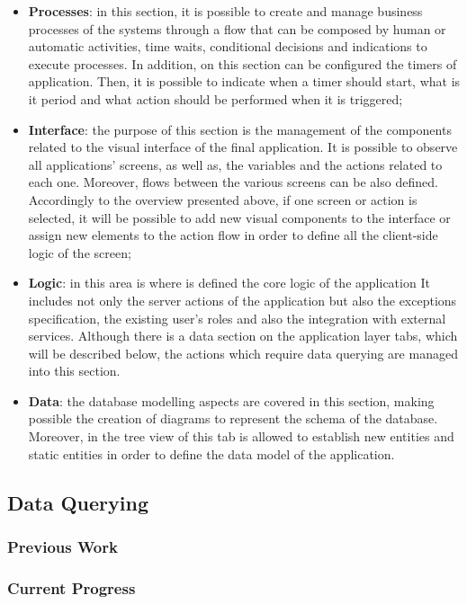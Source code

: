 \begin{itemize}
	\item \textbf{Processes}: in this section, it is possible to create and manage business processes of the systems through a flow that can be composed by human or automatic activities, time waits, conditional decisions and indications to execute processes. In addition, on this section can be configured the timers of application. Then, it is possible to indicate when a timer should start, what is it period and what action should be performed when it is triggered;
	\item \textbf{Interface}: the purpose of this section is the management of the components related to the visual interface of the final application. It is possible to observe all applications’ screens, as well as, the variables and the actions related to each one. Moreover, flows between the various screens can be also defined. Accordingly to the overview presented above, if one screen or action is selected, it will be possible to add new visual components to the interface or assign new elements to the action flow in order to define all the client-side logic of the screen;
	\item \textbf{Logic}: in this area is where is defined the core logic of the application It includes not only the server actions of the application but also the exceptions specification, the existing user’s roles and also the integration with external services. Although there is a data section on the application layer tabs, which will be described below, the actions which require data querying are managed into this section.
	\item \textbf{Data}: the database modelling aspects are covered in this section, making possible the creation of diagrams to represent the schema of the database. Moreover, in the tree view of this tab  is allowed to establish new entities and static entities in order to define the data model of the application.
\end{itemize}

\subsection{Data Querying}
\label{subsec:data_querying}

\subsubsection{Previous Work}
\label{subsubsec:previous_work}

\subsubsection{Current Progress}
\label{subsubsec:current_progress}

